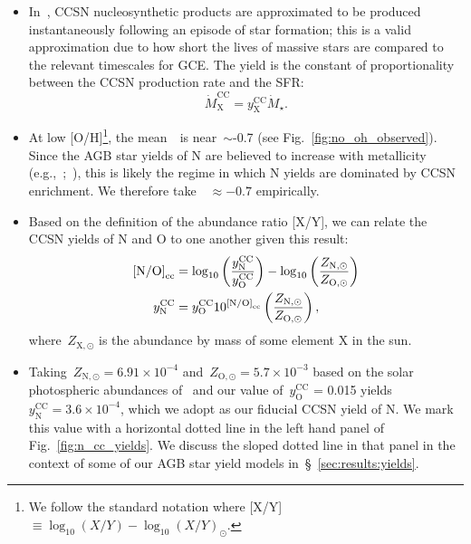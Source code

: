 \documentclass[ms.tex]{subfiles}
\begin{document}
\begin{itemize} 
	\item In~\vice, CCSN nucleosynthetic products are approximated to be 
	produced instantaneously following an episode of star formation; this is a 
	valid approximation due to how short the lives of massive stars are 
	compared to the relevant timescales for GCE. 
	The yield is the constant of proportionality between the CCSN production 
	rate and the SFR: 
	\begin{equation} 
	\dot{M}_\text{X}^\text{CC} = y_\text{X}^\text{CC}\dot{M}_\star. 
	\end{equation} 

	\item At low [O/H]\footnote{
		We follow the standard notation where 
		[X/Y]~$\equiv \log_{10}(X/Y) - \log_{10}(X/Y)_\odot$. 
	}, the mean~\no~is near~$\sim$-0.7 (see Fig.~\ref{fig:no_oh_observed}). 
	Since the AGB star yields of N are believed to increase with metallicity 
	(e.g.,~\cristallo;~\ventura), this is likely the regime in which N yields 
	are dominated by CCSN enrichment. 
	We therefore take~\no\subcc~$\approx -0.7$ empirically. 

	\item Based on the definition of the abundance ratio [X/Y], we can relate 
	the CCSN yields of N and O to one another given this result: 
	\begin{subequations}\begin{align} 
	\text{[N/O]}_\text{cc} &= 
	\log_{10}\left(\frac{y_\text{N}^\text{CC}}{y_\text{O}^\text{CC}}\right) - 
	\log_{10}\left(\frac{Z_{\text{N},\odot}}{Z_{\text{O},\odot}}\right) 
	\label{eq:no_cc}
	\\ 
	y_\text{N}^\text{CC} &= 
	y_\text{O}^\text{CC} 10^{\text{[N/O]}_\text{cc}} 
	\left(\frac{Z_{\text{N},\odot}}{Z_{\text{O},\odot}}\right), 
	\end{align}\end{subequations} 
	where~$Z_{\text{X},\odot}$ is the abundance by mass of some element X in 
	the sun. 

	\item Taking~$Z_{\text{N},\odot} = 6.91\times10^{-4}$ 
	and~$Z_{\text{O},\odot} = 5.7\times10^{-3}$ based on the solar photospheric 
	abundances of~\citet{Asplund2009} and our value of~$y_\text{O}^\text{CC}$ = 
	0.015 yields~$y_\text{N}^\text{CC} = 3.6\times10^{-4}$, which we adopt as 
	our fiducial CCSN yield of N. 
	We mark this value with a horizontal dotted line in the left hand panel 
	of Fig.~\ref{fig:n_cc_yields}. 
	We discuss the sloped dotted line in that panel in the context of some of 
	our AGB star yield models in~\S~\ref{sec:results:yields}. 


\end{itemize}
\end{document}
